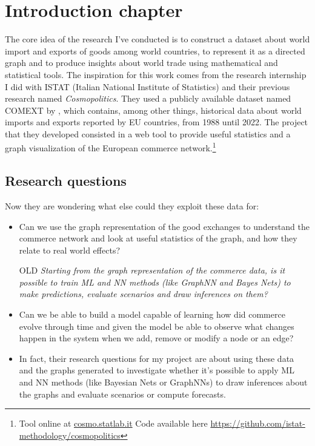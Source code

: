 \chapter{Introduction chapter}

The core idea of the research I've conducted is to construct a dataset about world import and exports of goods among world countries, to represent it as a directed graph and to produce insights about world trade using mathematical and statistical tools.
The inspiration for this work comes from the research internship I did with ISTAT (Italian National Institute of Statistics) and their previous research named \textit{Cosmopolitics}. %
They used a publicly available dataset named COMEXT by \textcite{eurostat2022comext}, which contains, among other things, historical data about world imports and exports reported by EU countries, from 1988 until 2022. The project that they developed consisted in a web tool to provide useful statistics and a graph visualization of the European commerce network.\footnote{Tool online at  \href{https://cosmo.statlab.it/}{cosmo.statlab.it} Code available here \url{https://github.com/istat-methodology/cosmopolitics}}


\section{Research questions}

Now they are wondering what else could they exploit these data for:
\begin{itemize}
    \item Can we use the graph representation of the good exchanges to understand the commerce network and look at useful statistics of the graph, and how they relate to real world effects?
    \item[OLD] \textit{Starting from the graph representation of the commerce data, is it possible to train ML and NN methods (like GraphNN and Bayes Nets) to make predictions, evaluate scenarios and draw inferences on them?}
    \item Can we be able to build a model capable of learning how did commerce evolve through time and given the model be able to observe what changes happen in the system when we add, remove or modify a node or an edge?
    \item In fact, their research questions for my project are about using these data and the graphs generated to investigate whether it’s possible to apply ML and NN methods (like Bayesian Nets or GraphNNs) to draw inferences about the graphs and evaluate scenarios or compute forecasts.
\end{itemize}